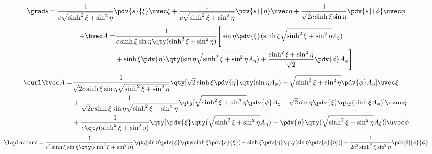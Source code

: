 \begin{equation}
\grad s = \frac{1}{c\sqrt{\sinh^2\xi+\sin^2\eta}} \pdv{s}{\xi}\uvec \xi + \frac{1}{c\sqrt{\sinh^2\xi+\sin^2\eta}}\pdv{s}{\eta} \uvec \eta +  \frac{1}{\sqrt{2}c\sinh\xi\sin\eta}\pdv{s}{\phi}\uvec \phi
\end{equation}
\begin{equation}
\begin{aligned}
\div \bvec A = &\frac{1}{c\sinh\xi\sin\eta\qty(\sinh^2\xi+\sin^2\eta)}\Bigg[\sin\eta\pdv{\xi}(\sinh\xi\sqrt{\sinh^2\xi+\sin^2\eta}A_\xi) \\&+ \sinh\xi\pdv{\eta}\qty(\sin\eta\sqrt{\sinh^2\xi+\sin^2\eta}A_\eta) + \frac{\sinh^2\xi+\sin^2\eta}{\sqrt{2}}\pdv{\phi}A_\phi\Bigg]
\end{aligned}
\end{equation}
\begin{equation}
\begin{aligned}
\curl \bvec A =& \frac{1}{\sqrt{2}c\sinh\xi\sin\eta\sqrt{\sinh^2\xi+\sin^2\eta}}\qty[\sqrt{2}\sinh\xi\pdv{\eta}\qty(\sin\eta
A_\phi) - \sqrt{\sinh^2\xi+\sin^2\eta}\pdv{\phi}A_\eta]\uvec \xi\\
&+ \frac{1}{\sqrt{2}c\sinh\xi\sin\eta\sqrt{\sinh^2\xi+\sin^2\eta}}\qty[\sqrt{\sinh^2\xi+\sin^2\eta}\pdv{\phi}A_\xi - \sqrt{2}\sin\eta\pdv{\xi}\qty(\sinh\xi
A_\phi)]\uvec \eta
\\
&+\frac{1}{c\qty(\sinh^2\xi+\sin^2\eta)}\qty[\pdv{\xi}\qty(\sqrt{\sinh^2\xi+\sin^2\eta}A_\eta) - \pdv{\eta}\qty(\sqrt{\sinh^2\xi+\sin^2\eta}A_\xi)]\uvec \phi
\end{aligned}
\end{equation}
\begin{equation}
\laplacian s = \frac{1}{c^2\sinh\xi\sin\eta\qty(\sinh^2\xi+\sin^2\eta)}\qty[\sin\eta\pdv{\xi}\qty(\sinh\xi\pdv{s}{\xi}) + \sinh\xi\pdv{\eta}\qty(\sin\eta\pdv{s}{\eta})]+ \frac{1}{2c^2\sinh^2\xi\sin^2\eta }\pdv[2]{s}{\phi}
\end{equation}

